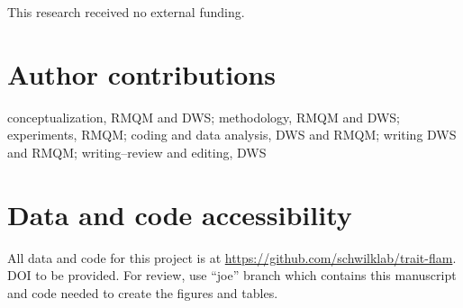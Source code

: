 \documentclass[letterpaper,12pt]{article}
\begin{document}
This research received no external funding.

\section*{Author contributions}

conceptualization, RMQM and DWS; methodology, RMQM and DWS; experiments, RMQM;
coding and data analysis, DWS and RMQM; writing DWS and RMQM; writing--review
and editing, DWS

\section*{Data and code accessibility}
All data and code for this project is at
\url{https://github.com/schwilklab/trait-flam}. DOI to be provided. For review,
use ``joe'' branch which contains this manuscript and code needed to create the
figures and tables.

\newpage




\end{document}
